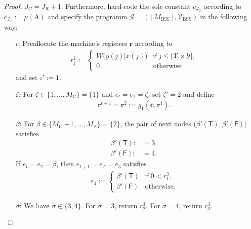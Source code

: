 \documentclass[conference]{IEEEtran}
\def\X{{\mathcal X}}
\def\Y{{\mathcal Y}}
\def\G{{\mathcal G}}
\def\V{{\mathcal V}}
\def\mA{\bm{\mathrm{A}}}
\newcommand{\BSS}{\mathrm{BSS}}
\begin{document}
\begin{proof}
					\(J_\mathrm{C} = J_\mathrm{R} + 1\). Furthermore, hard-code the sole constant \(c_{J_\mathrm{C}}\) according to
					\(c_{J_\mathrm{C} } := \mu(\mA)\) and specify the programm \(\G = ([M_\BSS],\V_\BSS)\) in the following way:
					\begin{enumerate}	\item[\(\iota\)\hspace{1pt}:] Preallocate the machine's registers \(\bm{r}\) according to
											\begin{align}	r^1_j :=	\begin{cases}	W\big(y(j)|x(j)\big)	&\text{if}~ j\leq |\X\times\Y|,\\
																						0						&\text{otherwise}
																		\end{cases}
											\end{align}
											and set \(\iota' := 1\).
										\item[\(\zeta\)\hspace{1pt}:] For \(\zeta \in \{1,\ldots, M_\mathrm{C}\} = \{1\}\) and \(e_t = e_1 = \zeta\), set \(\zeta' = 2\) and define 
											\begin{align*}	\bm{r}^{t+1} = \bm{r}^{2} := g_1(\bm{c},\bm{r}^1).
											\end{align*}
										\item[\(\beta\)\hspace{1pt}:] 
											For \(\beta \in \{M_\mathrm{C} + 1,\ldots, M_\mathrm{B}\} = \{2\}\), the pair of next nodes \(\big(\beta'(\mathsf{T}),
											\beta'(\mathsf{F})\big)\) satisfies
											\begin{align*} 	\beta'(\mathsf{T}) :    &=  3, \\
															\beta'(\mathsf{F}) :    &=  4.
											\end{align*}
											If \(e_t = e_2 = \beta\), then \(e_{t+1} = e_T = e_3\) satisfies
											\begin{align*}   e_{3} := 	\begin{cases}   \beta'(\mathsf{T}) &\text{if}~ 0 < r_1^3,\\
																						\beta'(\mathsf{F}) &\text{otherwise}.
																		\end{cases}
											\end{align*}
										\item[\(\sigma\)\hspace{1pt}:] We have \(\sigma \in \{3,4\}\). For \(\sigma = 3\), return \(r_2^3\). For \(\sigma = 4\), return \(r_3^3\).
					\end{enumerate}

\end{proof}
\end{document}
